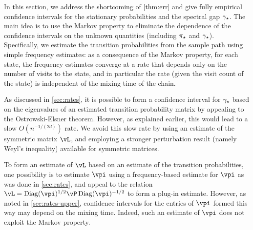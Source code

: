 In this section, we address the shortcoming of \cref{thm:err} and give
fully empirical confidence intervals for the stationary probabilities
and the spectral gap $\gamma_{\star}$.
The main idea is to use the Markov property to eliminate the
dependence of the confidence intervals on the unknown quantities
(including $\pi_{\star}$ and $\gamma_{\star}$).
Specifically, we estimate the transition probabilities from the sample
path using simple frequency estimates: as a consequence of the Markov
property, for each state, the frequency estimates converge at a rate
that depends only on the number of visits to the state, and in
particular the rate (given the visit count of the state) is
independent of the mixing time of the chain.

As discussed in \cref{sec:rates}, it is possible to form a confidence
interval for $\gamma_{\star}$ based on the eigenvalues of an estimated
transition probability matrix by appealing to the
Ostrowski-Elsner theorem.
However, as explained earlier, this would lead to a slow
$O(n^{-1/(2d)})$ rate.
We avoid this slow rate by using an estimate of the symmetric matrix
$\vL$, and employing a stronger perturbation result (namely Weyl's
inequality) available for symmetric matrices.

To form an estimate of $\vL$ based on an estimate of the transition
probabilities, one possibility is to estimate $\vpi$ using a
frequency-based estimate for $\vpi$ as was done in \cref{sec:rates},
and appeal to the relation $\vL = \Diag(\vpi)^{1/2} \vP
\Diag(\vpi)^{-1/2}$ to form a plug-in estimate.
However, as noted in \cref{sec:rates-upper}, confidence intervals for
the entries of $\vpi$ formed this way may depend on the mixing time.
Indeed, such an estimate of $\vpi$ does not exploit the Markov
property.

